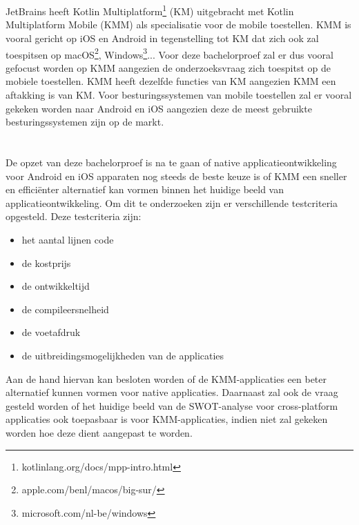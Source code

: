 \section{}
\label{sec:afbakening}

JetBrains heeft Kotlin Multiplatform\footnote{kotlinlang.org/docs/mpp-intro.html} (KM) uitgebracht met Kotlin Multiplatform Mobile (KMM) als specialisatie voor de mobile toestellen. KMM is vooral gericht op iOS en Android in tegenstelling tot KM dat zich ook zal toespitsen op macOS\footnote{apple.com/benl/macos/big-sur/}, Windows\footnote{microsoft.com/nl-be/windows}... Voor deze bachelorproef zal er dus vooral gefocust worden op KMM aangezien de onderzoeksvraag zich toespitst op de mobiele toestellen. KMM heeft dezelfde functies van KM aangezien KMM een aftakking is van KM. Voor besturingssystemen van mobile toestellen zal er vooral gekeken worden naar Android en iOS aangezien deze de meest gebruikte besturingssystemen zijn op de markt.


\section{}
\label{sec:onderzoeksvraag}

De opzet van deze bachelorproef is na te gaan of native applicatieontwikkeling voor Android en iOS apparaten nog steeds de beste keuze is of KMM een sneller en efficiënter alternatief kan vormen binnen het huidige beeld van applicatieontwikkeling. Om dit te onderzoeken zijn er verschillende testcriteria opgesteld. Deze testcriteria zijn: 
\begin{itemize}
    \item het aantal lijnen code
    \item de kostprijs
    \item de ontwikkeltijd
    \item de compileersnelheid
    \item de voetafdruk
    \item de uitbreidingsmogelijkheden van de applicaties
\end{itemize}
Aan de hand hiervan kan besloten worden of de KMM-applicaties een beter alternatief kunnen vormen voor native applicaties. Daarnaast zal ook de vraag gesteld worden of het huidige beeld van de SWOT-analyse voor cross-platform applicaties ook toepasbaar is voor KMM-applicaties, indien niet zal gekeken worden hoe deze dient aangepast te worden. 


